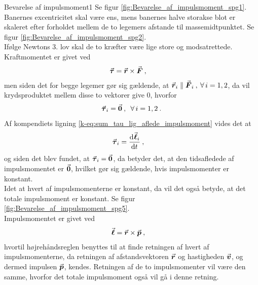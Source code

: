 %
\begin{opgave}{Bevarelse af impulsmoment}{1}
\opg Se figur \ref{fig:Bevarelse_af_impulsmoment_spg1}.\\
Banernes excentricitet skal være ens, mens banernes halve storakse blot er skaleret efter forholdet mellem de to legemers afstande til massemidtpunktet.
%
\opg Se figur \ref{fig:Bevarelse_af_impulsmoment_spg2}.\\
Ifølge Newtons 3. lov skal de to kræfter være lige store og modsatrettede.
%
\opg Kraftmomentet er givet ved
\begin{align*}
	\v{\tau} &= \v{r} \times \v{F} \: ,
\end{align*}
men siden det for begge legemer gør sig gældende, at $\v{r}_i \parallel \v{F}_i \: , \: \forall \, i = 1,2$, da vil krydsproduktet mellem disse to vektorer give $0$, hvorfor
\begin{align*}
	\v{\tau}_i = \v{0} \: , \enspace \forall \, i = 1,2 \: .
\end{align*}
%
\opg Af kompendiets ligning \eqref{k-eq:sum_tau_lig_aflede_impulsmoment} vides det at
\begin{align*}
	\v{\tau}_i &= \dif{t}{\v{\ell}_i} \: ,
\end{align*}
og siden det blev fundet, at $\v{\tau}_i = \v{0}$, da betyder det, at den tidsafledede af impulsmomentet er $\v{0}$, hvilket gør sig gældende, hvis impulsmomenter er konstant.\\
Idet at hvert af impulsmomenterne er konstant, da vil det også betyde, at det totale impulsmoment er konstant.
%
\opg Se figur \ref{fig:Bevarelse_af_impulsmoment_spg5}.\\
Impulsmomentet er givet ved
\begin{align*}
	\v{\ell} &= \v{r} \times \v{p} \: ,
\end{align*}
hvortil højrehåndsreglen benyttes til at finde retningen af hvert af impulsmomenterne, da retningen af  afstandsvektoren $\v{r}$ og hastigheden $\v{v}$, og dermed impulsen $\v{p}$, kendes. Retningen af de to impulsmomenter vil være den samme, hvorfor det totale impulsmoment også vil gå i denne retning.
\end{opgave}
%
%
